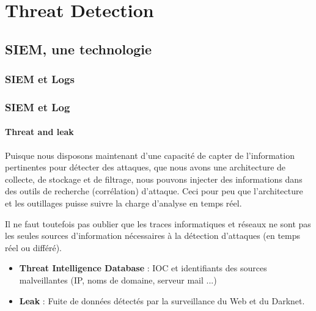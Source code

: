 

\section{Threat Detection}

\subsection{SIEM, une technologie}

\subsubsection{SIEM et Logs}

\begin{frame}
\frametitle<presentation>{SIEM et Log}
\framesubtitle<presentation>{Threat and leak}
Puisque nous disposons maintenant d'une capacité de capter de l'information pertinentes pour détecter des attaques, que nous avons une architecture de collecte, de stockage et de filtrage, nous pouvons injecter des informations dans des outils de recherche (corrélation) d'attaque.
Ceci pour peu que l'architecture et les outillages puisse suivre la charge d'analyse en temps réel.

Il ne faut toutefois pas oublier que les traces informatiques et réseaux ne sont pas les seules sources d'information nécessaires à la détection d'attaques (en temps réel ou différé).

\begin{itemize}
  \item \textbf{Threat Intelligence Database }:  IOC et identifiants des sources malveillantes (IP, noms de domaine, serveur mail ...)
  \item  \textbf{Leak} : Fuite de données détectés par la surveillance du Web et du Darknet.
\end{itemize}

\end{frame}




